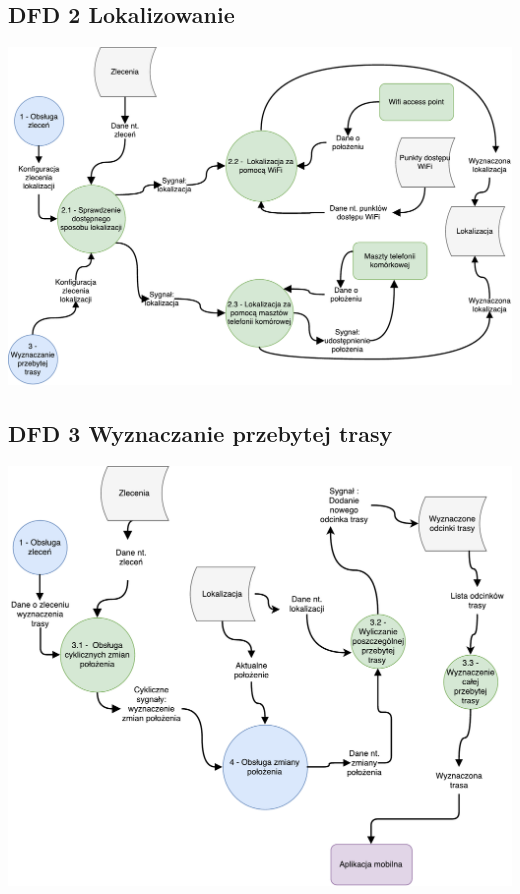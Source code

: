 \documentclass[11pt]{article}
\begin{document}
	\subsection{DFD 2 Lokalizowanie}
	\begin{center}
		\includegraphics[scale=0.6]{DFD2.pdf}
	\end{center}
	\newpage
	\subsection{DFD 3 Wyznaczanie przebytej trasy}
	\begin{center}
		\includegraphics[scale=0.6]{DFD3.pdf}
	\end{center}
\end{document}
